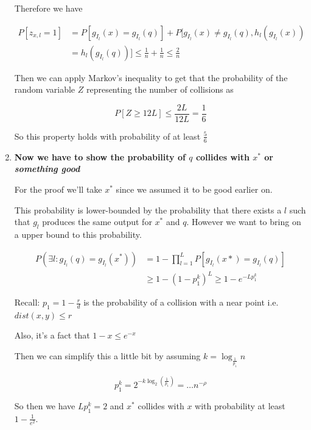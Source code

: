 \documentclass[../notes.tex]{subfiles}
\begin{document}
\begin{enumerate}
Therefore we have

\begin{equation}
    \begin{split}
        P[z_{x,l} = 1] &= P[g_{I_l}(x) = g_{I_l}(q)] + P[g_{I_l}(x) \neq g_{I_l}(q), h_l(g_{I_l}(x))  \\
&=  h_l(g_{I_l}(q))] \le  \frac{1}{n} + \frac{1}{n} \le  \frac{2}{n}
    \end{split}
\end{equation}


Then we can apply Markov's inequality to get that the probability of the random variable $ Z $ representing the number of collisions as

\begin{equation}
    P[Z \ge  12L] \le  \frac{2L}{12L} = \frac{1}{6}
\end{equation}

So this property holds with probability of at least $ \frac{5}{6} $


\item  \textbf{Now we have to show the probability of $ q $ collides with $ x^* $ or \textit{something good}}

For the proof we'll take $ x^* $ since we assumed it to be good earlier on.

This probability is lower-bounded by the probability that there exists a $ l $ such that $ g_l $ produces the same output for $ x^* $ and $ q $.
However we want to bring on a upper bound to this probability.


\begin{equation}
    \begin{split}
        P(\exists l : g_{I_l}(q) = g_{I_l}(x^*)) &= 1-\prod^L_{l=1} P[g_{I_l}(x*) =  g_{I_l}(q)]  \\
        &\ge 1 - (1-p_1^k)^L \ge  1 - e^{-L p_1^k} 
    \end{split}
\end{equation}


\begin{blockquote}
    Recall: $ p_1 = 1 - \frac{r}{d} $  is the probability of a collision with a near point i.e. $ dist(x,y) \le r $

    Also, it's a fact that $ 1-x \le  e^{-x} $
\end{blockquote}


Then we can simplify this a little bit by assuming $ k = \log_{\frac{1}{p_1}} n $

\begin{equation}
    p_1^k = 2^{-k \log_2 (\frac{1}{p_1})} = \ldots n^{-\rho}
\end{equation}

So then we have $ Lp_1^k = 2 $ and $ x^*  $ collides with $ x $ with probability at least $ 1-\frac{1}{e^2} $.


\end{enumerate}
\end{document}
